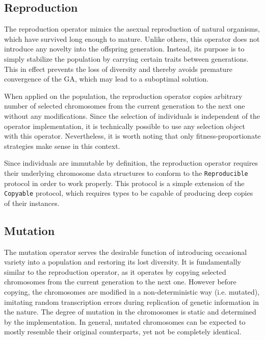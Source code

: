 \subsection{Reproduction}\label{section:reproduction}
The reproduction operator mimics the asexual reproduction of natural organisms, which have survived long enough to mature. Unlike others, this operator does not introduce any novelty into the offspring generation. Instead, its purpose is to simply stabilize the population by carrying certain traits between generations. This in effect prevents the loss of diversity and thereby avoids premature convergence of the GA, which may lead to a suboptimal solution.

When applied on the population, the reproduction operator copies arbitrary number of selected chromosomes from the current generation to the next one without any modifications. Since the selection of individuals is independent of the operator implementation, it is technically possible to use any selection object with this operator. Nevertheless, it is worth noting that only fitness-proportionate strategies make sense in this context.

\todo %

Since individuals are immutable by definition, the reproduction operator requires their underlying chromosome data structures to conform to the \texttt{Reproducible} protocol in order to work properly. This protocol is a simple extension of the \texttt{Copyable} protocol, which requires types to be capable of producing deep copies of their instances.

\subsection{Mutation}\label{section:mutation}
The mutation operator serves the desirable function of introducing occasional variety into a population and restoring its lost diversity. \cite{Koza1992} It is fundamentally similar to the reproduction operator, as it operates by copying selected chromosomes from the current generation to the next one. However before copying, the chromosomes are modified in a non-deterministic way (i.e. mutated), imitating random transcription errors during replication of genetic information in the nature. The degree of mutation in the chromosomes is static and determined by the implementation. In general, mutated chromosomes can be expected to mostly resemble their original counterparts, yet not be completely identical.

